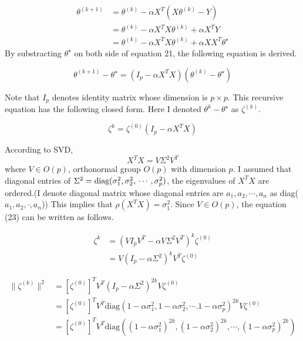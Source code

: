 \documentclass[10pt]{article}
\begin{document}
\begin{align}
    \theta^{(k+1)} &= \theta^{(k)}  - \alpha X^T(X\theta^{(k)}- Y) \\
    &= \theta^{(k)} - \alpha X^TX\theta^{(k)} + \alpha X^TY \\
    &= \theta^{(k)} - \alpha X^TX\theta^{(k)} + \alpha XX^T \theta^\star
\end{align}
By substracting $\theta^\star$ on both side of equation 21, the following equation is derived.

\begin{equation}
    \theta^{(k+1)} - \theta^\star = (I_p - \alpha X^TX)(\theta^{(k)} - \theta^\star)
\end{equation}

Note that $I_p$ denotes identity matrix whose dimension is $p \times p$. This recursive equation has the following closed form. Here I denoted $\theta^{k} - \theta^{\star}$ as $\zeta^{(k)}$.

\begin{equation}
    \zeta^{k} = \zeta^{(0)}(I_p - \alpha X^TX) 
\end{equation}

According to SVD, 
\begin{equation}
    X^TX = V\Sigma^2V^T
\end{equation}
where $V \in O(p)$, orthonormal group $O(p)$ with dimension $p$. I assumed that diagonal entries of $\Sigma^2 = \text{diag}(\sigma_1^2, \sigma_2^2,\\ \cdots, \sigma_p^2)$, 
the eigenvalues of $X^TX$ are ordered.(I denote diagonal matrix whose diagonal entries are $a_1,a_2,\cdots,a_n$ as diag($a_1,a_2,\cdot, a_n$))
This implies that $\rho(X^TX) = \sigma_1^2$. Since $V \in O(p)$, the equation (23) can be written as follows.

\begin{align}
    \zeta^{k} &= \left(VI_pV^T - \alpha V\Sigma^2V^T\right)^k\zeta^{(0)} \\
    &= V(I_p - \alpha \Sigma^2)^kV^T \zeta^{(0)}
\end{align}

\begin{align}
    \lVert\zeta^{(k)}\rVert^2 &= [\zeta^{(0)}]^TV^T (I_p - \alpha\Sigma^2)^{2k}V\zeta^{(0)} \\
    &= [\zeta^{(0)}]^TV^T \text{diag}(1 - \alpha \sigma_1^2, 1 - \alpha \sigma_2^2, \cdots. 1 - \alpha \sigma_p^2)^{2k} V\zeta^{(0)} \\
    &= [\zeta^{(0)}]^TV^T \text{diag}((1-\alpha \sigma_1^2)^{2k}, (1-\alpha \sigma_2^2)^{2k}, \cdots, (1-\alpha \sigma_p^2)^{2k})
\end{align}
\end{document}
